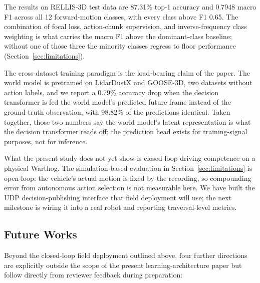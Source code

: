 \documentclass[sensors,article,submit,pdftex,moreauthors]{Definitions/mdpi}
\providecommand{\DIFadd}[1]{{\protect\color{red}#1}} %
\providecommand{\DIFaddbegin}{} %
\providecommand{\DIFaddincludegraphics}[2][]{{\color{blue}\fbox{\DIFOincludegraphics[#1]{#2}}}} %
\DeclareRobustCommand{\DIFaddbegin}{\DIFOaddbegin \let\includegraphics\DIFaddincludegraphics} %
\begin{document}
The results on RELLIS-3D test data are 87.31\% top-1 accuracy and 0.7948 macro F1 across all 12 forward-motion classes, with every class above F1 0.65. The combination of focal loss, action-chunk supervision, and inverse-frequency class weighting is what carries the macro F1 above the dominant-class baseline; without one of those three the minority classes regress to floor performance (Section~\ref{sec:limitations}).

The cross-dataset training paradigm is the load-bearing claim of the paper. The world model is pretrained on LidarDustX and GOOSE-3D, two datasets without action labels, and we report a 0.79\% accuracy drop when the decision transformer is fed the world model's predicted future frame instead of the ground-truth observation, with 98.82\% of the predictions identical. Taken together, those two numbers say the world model's latent representation is what the decision transformer reads off; the prediction head exists for training-signal purposes, not for inference.

What the present study does not yet show is closed-loop driving competence on a physical Warthog. The simulation-based evaluation in Section~\ref{sec:limitations} is open-loop: the vehicle's actual motion is fixed by the recording, so compounding error from autonomous action selection is not measurable here. We have built the UDP decision-publishing interface that field deployment will use; the next milestone is wiring it into a real robot and reporting traversal-level metrics.

\DIFaddbegin \subsection{\DIFadd{Future Works}}
\label{sec:future_works}

\DIFadd{Beyond the closed-loop field deployment outlined above, four further directions are explicitly outside the scope of the present learning-architecture paper but follow directly from reviewer feedback during preparation:
}
\end{document}
